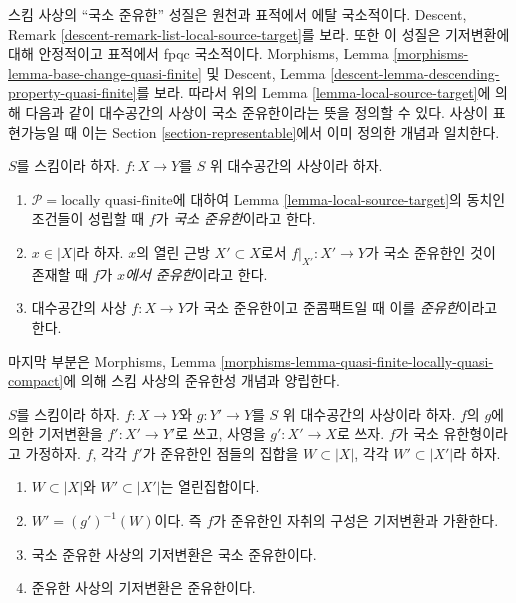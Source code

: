 \noindent
스킴 사상의 “국소 준유한” 성질은 원천과 표적에서 에탈 국소적이다.
Descent, Remark \ref{descent-remark-list-local-source-target}를 보라.
또한 이 성질은 기저변환에 대해 안정적이고 표적에서 fpqc 국소적이다.
Morphisms, Lemma \ref{morphisms-lemma-base-change-quasi-finite} 및
Descent, Lemma \ref{descent-lemma-descending-property-quasi-finite}를 보라.
따라서 위의 Lemma \ref{lemma-local-source-target}에 의해 다음과 같이
대수공간의 사상이 국소 준유한이라는 뜻을 정의할 수 있다.
사상이 표현가능일 때 이는 Section \ref{section-representable}에서
이미 정의한 개념과 일치한다.

\begin{definition}
\label{definition-locally-quasi-finite}
$S$를 스킴이라 하자.
$f : X \to Y$를 $S$ 위 대수공간의 사상이라 하자.
\begin{enumerate}
\item $\mathcal{P} = \text{locally quasi-finite}$에 대하여
Lemma \ref{lemma-local-source-target}의 동치인 조건들이 성립할 때
$f$가 {\it 국소 준유한}이라고 한다.
\item $x \in |X|$라 하자. $x$의 열린 근방 $X' \subset X$로서
$f|_{X'} : X' \to Y$가 국소 준유한인 것이 존재할 때
$f$가 {\it $x$에서 준유한}이라고 한다.
\item 대수공간의 사상 $f : X \to Y$가 국소 준유한이고
준콤팩트일 때 이를 {\it 준유한}이라고 한다.
\end{enumerate}
\end{definition}

\noindent
마지막 부분은 Morphisms, Lemma
\ref{morphisms-lemma-quasi-finite-locally-quasi-compact}에 의해
스킴 사상의 준유한성 개념과 양립한다.

\begin{lemma}
\label{lemma-base-change-quasi-finite-locus}
$S$를 스킴이라 하자. $f : X \to Y$와 $g : Y' \to Y$를
$S$ 위 대수공간의 사상이라 하자. $f$의 $g$에 의한 기저변환을
$f' : X' \to Y'$로 쓰고, 사영을 $g' : X' \to X$로 쓰자.
$f$가 국소 유한형이라고 가정하자.
$f$, 각각 $f'$가 준유한인 점들의 집합을
$W \subset |X|$, 각각 $W' \subset |X'|$라 하자.
\begin{enumerate}
\item $W \subset |X|$와 $W' \subset |X'|$는 열린집합이다.
\item $W' = (g')^{-1}(W)$이다. 즉 $f$가 준유한인 자취의 구성은
기저변환과 가환한다.
\item 국소 준유한 사상의 기저변환은 국소 준유한이다.
\item 준유한 사상의 기저변환은 준유한이다.
\end{enumerate}
\end{lemma}

